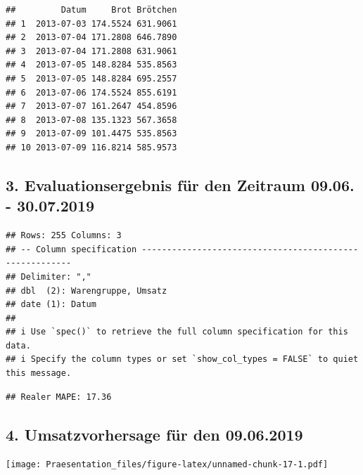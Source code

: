 \documentclass[
]{article}
\begin{document}
\begin{verbatim}
##         Datum     Brot Brötchen
## 1  2013-07-03 174.5524 631.9061
## 2  2013-07-04 171.2808 646.7890
## 3  2013-07-04 171.2808 631.9061
## 4  2013-07-05 148.8284 535.8563
## 5  2013-07-05 148.8284 695.2557
## 6  2013-07-06 174.5524 855.6191
## 7  2013-07-07 161.2647 454.8596
## 8  2013-07-08 135.1323 567.3658
## 9  2013-07-09 101.4475 535.8563
## 10 2013-07-09 116.8214 585.9573
\end{verbatim}

\hypertarget{evaluationsergebnis-fuxfcr-den-zeitraum-09.06.---30.07.2019}{%
\subsection{3. Evaluationsergebnis für den Zeitraum 09.06. -
30.07.2019}\label{evaluationsergebnis-fuxfcr-den-zeitraum-09.06.---30.07.2019}}

\begin{verbatim}
## Rows: 255 Columns: 3
## -- Column specification --------------------------------------------------------
## Delimiter: ","
## dbl  (2): Warengruppe, Umsatz
## date (1): Datum
## 
## i Use `spec()` to retrieve the full column specification for this data.
## i Specify the column types or set `show_col_types = FALSE` to quiet this message.
\end{verbatim}

\begin{verbatim}
## Realer MAPE: 17.36
\end{verbatim}

\hypertarget{umsatzvorhersage-fuxfcr-den-09.06.2019}{%
\subsection{4. Umsatzvorhersage für den
09.06.2019}\label{umsatzvorhersage-fuxfcr-den-09.06.2019}}

\texttt{[image: Praesentation\_files/figure-latex/unnamed-chunk-17-1.pdf]}
\end{document}
